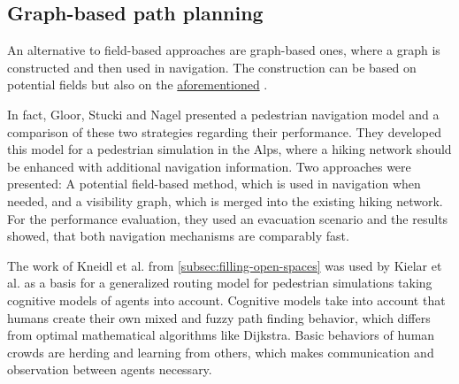 	\subsection{Graph-based path planning}
	
		An alternative to field-based approaches are graph-based ones, where a graph is constructed and then used in navigation.
		The construction can be based on potential fields but also on the \hyperref[subsec:related-work:visibility-graph]{aforementioned} .
		
		In fact, Gloor, Stucki and Nagel presented a pedestrian navigation model and a comparison of these two strategies regarding their performance\cite{gloor-hybrid-pedestrian-routing}.
		They developed this model for a pedestrian simulation in the Alps, where a hiking network should be enhanced with additional navigation information.
		Two approaches were presented: A potential field-based method, which is used in navigation when needed, and a visibility graph, which is merged into the existing hiking network.
		For the performance evaluation, they used an evacuation scenario and the results showed, that both navigation mechanisms are comparably fast.
		
		The work of Kneidl et al. from \cref{subsec:filling-open-spaces} was used by Kielar et al. as a basis for a generalized routing model for pedestrian simulations\cite{kielar-unified-pedestrian-routing} taking cognitive models of agents into account.
		Cognitive models take into account that humans create their own mixed and fuzzy path finding behavior, which differs from optimal mathematical algorithms like Dijkstra.
		Basic behaviors of human crowds are herding and learning from others, which makes communication and observation between agents necessary.
		
		